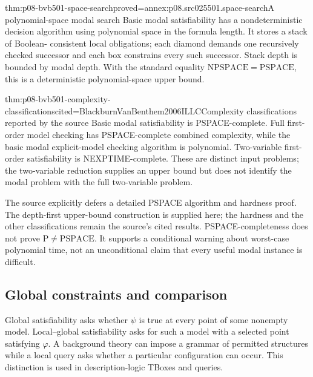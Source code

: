 \begin{hbtheorem}{thm:p08-bvb501-space-search}{proved=annex:p08.src025501.space-search}{A polynomial-space modal search}
Basic modal satisfiability has a nondeterministic decision algorithm using
polynomial space in the formula length. It stores a stack of Boolean-
consistent local obligations; each diamond demands one recursively
checked successor and each box constrains every such successor. Stack
depth is bounded by modal depth. With the standard equality
\(\mathrm{NPSPACE}=\mathrm{PSPACE}\), this is a deterministic
polynomial-space upper bound.
\end{hbtheorem}

\begin{hbtheorem}{thm:p08-bvb501-complexity-classifications}{cited=BlackburnVanBenthem2006ILLC}{Complexity classifications reported by the source}
Basic modal satisfiability is PSPACE-complete. Full first-order model
checking has PSPACE-complete combined complexity, while the basic modal
explicit-model checking algorithm is polynomial. Two-variable first-order
satisfiability is NEXPTIME-complete. These are distinct input problems;
the two-variable reduction supplies an upper bound but does not identify
the modal problem with the full two-variable problem.
\end{hbtheorem}

The source explicitly defers a detailed PSPACE algorithm and hardness
proof. The depth-first upper-bound construction is supplied here; the
hardness and the other classifications remain the source's cited results.
PSPACE-completeness does not prove \(\mathrm P\ne\mathrm{PSPACE}\).
It supports a conditional warning about worst-case polynomial time,
not an unconditional claim that every useful modal instance is difficult.

\subsection{Global constraints and comparison}
\label{sec:p08-bvb501-other-tasks}

Global satisfiability asks whether \(\psi\) is true at every point of
some nonempty model. Local--global satisfiability asks for such a model
with a selected point satisfying \(\varphi\). A background theory
can impose a grammar of permitted structures while a local query asks
whether a particular configuration can occur. This distinction is used
in description-logic TBoxes and queries.

